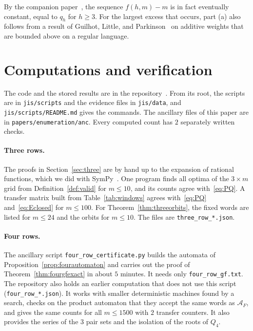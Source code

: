 \documentclass[12pt]{article}
\theoremstyle{plain}
\theoremstyle{definition}
\theoremstyle{remark}
\begin{document}
By the companion paper~\cite{pemmasaniExtremal}, the sequence $f(h,m)-m$ is in
fact eventually constant, equal to $q_h$ for $h\ge3$. For the largest excess
that occurs, part (a) also follows from a result of Guilhot, Little, and
Parkinson~\cite[Theorem~1(3)]{glp2025} on additive weights that are bounded
above on a regular language.
\section{Computations and verification}\label{sec:verify}

The code and the stored results are in the repository~\cite{repo}. From its
root, the scripts are in \nolinkurl{jis/scripts} and the evidence files in
\nolinkurl{jis/data}, and \nolinkurl{jis/scripts/README.md} gives the commands.
The ancillary files of this paper are in \nolinkurl{papers/enumeration/anc}.
Every computed count has $2$ separately written checks.

\paragraph{Three rows.} The proofs in Section~\ref{sec:three} are by hand up to
the expansion of rational functions, which we did with SymPy~\cite{sympy2017}.
One program finds all optima of the
$3\times m$ grid from Definition~\ref{def:valid} for $m\le10$, and its counts
agree with~\eqref{eq:PQ}. A transfer matrix built from Table~\ref{tab:windows}
agrees with~\eqref{eq:PQ} and~\eqref{eq:Eclosed} for $m\le100$. For
Theorem~\ref{thm:threeorbits}, the fixed words are listed for $m\le24$ and the
orbits for $m\le10$. The files are \nolinkurl{three_row_*.json}.

\paragraph{Four rows.} The ancillary script \nolinkurl{four_row_certificate.py}
builds the automata of Proposition~\ref{prop:fourautomaton} and carries out the
proof of Theorem~\ref{thm:fourgfexact} in about $5$ minutes. It needs only
\nolinkurl{four_row_gf.txt}. The repository also holds an earlier computation
that does not use this script (\nolinkurl{four_row_*.json}). It works with
smaller deterministic machines found by a search, checks on the product
automaton that they accept the same words as $\mathcal A_F$, and gives the
same counts for all $m\le1500$ with $2$ transfer counters. It also provides the
series of the $3$ pair sets and the isolation of the roots of $Q_4$.
\end{document}
